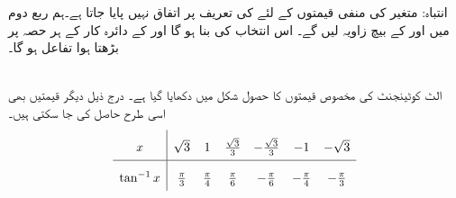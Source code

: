 انتباہ: \quad
متغیر  کی منفی قیمتوں کے لئے  کی تعریف پر اتفاق نہیں پایا جاتا ہے۔ہم ربع دوم میں  اور  کے بیچ زاویہ لیں گے۔ اس انتخاب کی بنا  ہو گا اور  کے دائرہ کار کے ہر حصہ پر  بڑھتا ہوا تفاعل ہو گا۔

\\
الٹ کوٹینجنٹ کی مخصوص قیمتوں کا حصول شکل  میں دکھایا گیا ہے۔ درج ذیل دیگر قیمتیں بھی اسی طرح حاصل کی جا سکتی ہیں۔
\begin{align*}
\renewcommand{\arraystretch}{2} 
\begin{array}{c|cccccc}
x&\sqrt{3}&1&\tfrac{\sqrt{3}}{3}&-\tfrac{\sqrt{3}}{3}&-1&-\sqrt{3}\\
\hline
\tan^{-1}x&\tfrac{\pi}{3}&\tfrac{\pi}{4}&\tfrac{\pi}{6}&-\tfrac{\pi}{6}&-\tfrac{\pi}{4}&-\tfrac{\pi}{3}
\end{array}
\end{align*}
